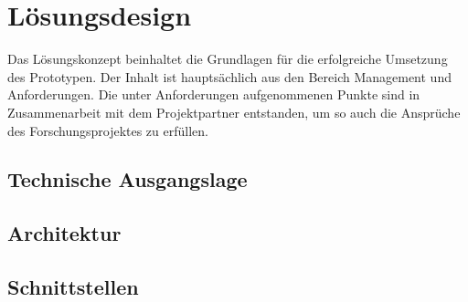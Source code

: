 \chapter{Lösungsdesign}

Das Lösungskonzept beinhaltet die Grundlagen für die erfolgreiche Umsetzung des Prototypen. Der Inhalt ist hauptsächlich aus den Bereich Management und Anforderungen. Die unter Anforderungen aufgenommenen Punkte sind in Zusammenarbeit mit dem Projektpartner entstanden, um so auch die Ansprüche des Forschungsprojektes zu erfüllen.

\section{Technische Ausgangslage}

\section{Architektur}

\section{Schnittstellen}